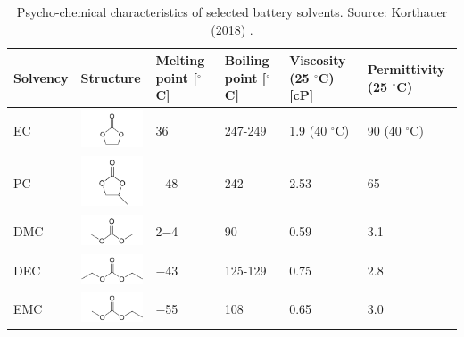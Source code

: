\begin{table}[H]
    \centering
        \begin{footnotesize}
            \begin{tabular}{|p{16mm} p{24mm} p{20mm} p{20mm} p{20mm} p{24mm}|}
                \hline
                \rowcolor{bluepoli!40}
                \textbf{Solvency} & \textbf{Structure} & \textbf{Melting point} [$^\circ$C] & \textbf{Boiling point} [$^\circ$C] & \textbf{Viscosity} (25 $^\circ$C) [cP] & \textbf{Permittivity} (25 $^\circ$C) \T\B \\
                \hline \hline
                EC & \includegraphics*[width=24mm]{Images/Chapter1/EC.png} & 36 & 247-249 & 1.9 (40 $^\circ$C) & 90 (40 $^\circ$C)\T\B\\
                \hline
                PC & \includegraphics*[width=24mm]{Images/Chapter1/PC.png} & $-$48 & 242 & 2.53 & 65\T\B\\
                \hline
                DMC & \includegraphics*[width=24mm]{Images/Chapter1/DMC.png} & 2$-$4 & 90 & 0.59 & 3.1\T\B\\
                \hline
                DEC & \includegraphics*[width=24mm]{Images/Chapter1/DEC.png} & $-$43 & 125-129 & 0.75 & 2.8\T\B\\
                \hline
                EMC & \includegraphics*[width=24mm]{Images/Chapter1/EMC.png} & $-$55 & 108 & 0.65 & 3.0\T\B\\
                \hline
                \end{tabular}
                \\[10pt]
                \caption[Psycho-chemical characteristics of selected battery solvents]{Psycho-chemical characteristics of selected battery solvents. Source: Korthauer (2018) \cite{korthauer2018lithium}.}
                \label{table:solvents}
        \end{footnotesize}
\end{table}

